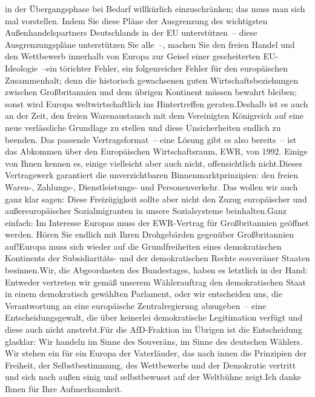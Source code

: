 \documentclass{article}
\begin{document}
in der Übergangsphase bei Bedarf willkürlich einzuschränken; das muss man sich mal vorstellen. Indem Sie diese Pläne der Ausgrenzung des wichtigsten Außenhandelspartners Deutschlands in der EU unterstützen – diese Ausgrenzungspläne unterstützen Sie alle –, machen Sie den freien Handel und den Wettbewerb innerhalb von Europa zur Geisel einer gescheiterten EU-Ideologie –ein törichter Fehler, ein folgenreicher Fehler für den europäischen Zusammenhalt; denn die historisch gewachsenen guten Wirtschaftsbeziehungen zwischen Großbritannien und dem übrigen Kontinent müssen bewahrt bleiben; sonst wird Europa weltwirtschaftlich ins Hintertreffen geraten.Deshalb ist es auch an der Zeit, den freien Warenaustausch mit dem Vereinigten Königreich auf eine neue verlässliche Grundlage zu stellen und diese Unsicherheiten endlich zu beenden. Das passende Vertragsformat – eine Lösung gibt es also bereits – ist das Abkommen über den Europäischen Wirtschaftsraum, EWR, von 1992. Einige von Ihnen kennen es, einige vielleicht aber auch nicht, offensichtlich nicht.Dieses Vertragswerk garantiert die unverzichtbaren Binnenmarktprinzipien: den freien Waren-, Zahlungs-, Dienstleistungs- und Personenverkehr. Das wollen wir auch ganz klar sagen: Diese Freizügigkeit sollte aber nicht den Zuzug europäischer und außereuropäischer Sozialmigranten in unsere Sozialsysteme beinhalten.Ganz einfach: Im Interesse Europas muss der EWR-Vertrag für Großbritannien geöffnet werden. Hören Sie endlich mit Ihren Drohgebärden gegenüber Großbritannien auf!Europa muss sich wieder auf die Grundfreiheiten eines demokratischen Kontinents der Subsidiaritäts- und der demokratischen Rechte souveräner Staaten besinnen.Wir, die Abgeordneten des Bundestages, haben es letztlich in der Hand: Entweder vertreten wir gemäß unserem Wählerauftrag den demokratischen Staat in einem demokratisch gewählten Parlament, oder wir entscheiden uns, die Verantwortung an eine europäische Zentralregierung abzugeben – eine Entscheidungsgewalt, die über keinerlei demokratische Legitimation verfügt und diese auch nicht anstrebt.Für die AfD-Fraktion im Übrigen ist die Entscheidung glasklar: Wir handeln im Sinne des Souveräns, im Sinne des deutschen Wählers. Wir stehen ein für ein Europa der Vaterländer, das nach innen die Prinzipien der Freiheit, der Selbstbestimmung, des Wettbewerbs und der Demokratie vertritt und sich nach außen einig und selbstbewusst auf der Weltbühne zeigt.Ich danke Ihnen für Ihre Aufmerksamkeit.
\end{document}
